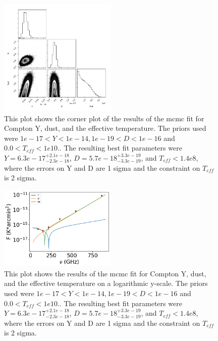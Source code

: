 \documentclass{princeton_astro_thesis}
\begin{document}
\begin{figure}[h]
\centering
\includegraphics[width=0.5\textwidth]{../CornerTeffplot.png}
\caption{This plot shows the corner plot of the results of the mcmc fit for Compton Y, dust, and the effective temperature. The priors used were $ 1e-17 < Y < 1e-14, 1e-19< D < 1e-16$ and $0.0 < T_{eff} <1e10.$. The resulting best fit parameters were $Y=6.3e-17^{+2.1e-18}_{-2.3e-18}$, $D=5.7e-18^{+3.3e-19}_{-3.3e-19}$, and $T_{eff}<1.4e8$, where the errors on Y and D are 1 sigma and the constraint on $T_{eff}$ is 2 sigma.}
\end{figure}

\begin{figure}[h]
\centering
\includegraphics[width=0.5\textwidth]{../redmapper_apfluxes_Tefffitlog.png}
\caption{This plot shows  the results of the mcmc fit for Compton Y, dust, and the effective temperature on a logarithmic y-scale. The priors used were $ 1e-17 < Y < 1e-14, 1e-19< D < 1e-16$ and $0.0 < T_{eff} <1e10.$. The resulting best fit parameters were $Y=6.3e-17^{+2.1e-18}_{-2.3e-18}$, $D=5.7e-18^{+3.3e-19}_{-3.3e-19}$, and $T_{eff}<1.4e8$, where the errors on Y and D are 1 sigma and the constraint on $T_{eff}$ is 2 sigma.}
\end{figure}
\end{document}
